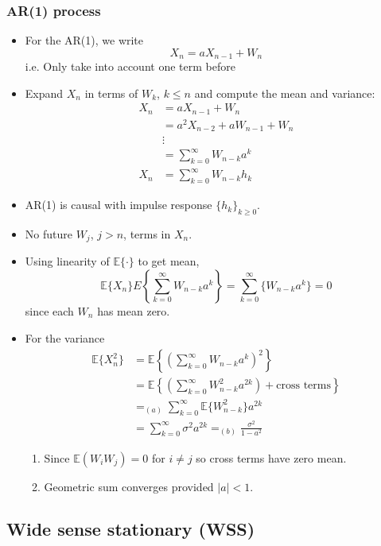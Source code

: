 \documentclass[12pt]{article}
\newcommand{\sigd}{\sigma^2}
\newcommand{\mexp}{\mathbb{E}}
\newcommand{\mexpval}[1]{\mathbb{E}(#1)}
\newcommand{\summ}[2]{\sum_{#1}^{#2}}
\newcommand{\sumkzeroinf}{\summ{k=0}{\infty}}
\begin{document}
\subsubsection{AR(1) process}
\begin{itemize}
    \item For the AR(1), we write
    \[
    X_n = a X_{n-1} + W_n
    \]
    i.e. Only take into account one term before
    \item Expand $X_n$ in terms of $W_k$, $k \le n$ and compute the mean and variance:
    \begin{align*}
        X_n & = a X_{n-1} + W_n\\
        & = a^2 X_{n-2} + a W_{n-1} + W_n\\
        & \vdots \\
        & = \summ{k=0}{\infty}W_{n-k}a^k \\
        X_n & = \summ{k=0}{\infty}W_{n-k}h_k
    \end{align*}
    \item AR(1) is causal with impulse response $\{h_k \}_{k\ge 0}$.
    \item No future $W_j$, $j > n$, terms in $X_n$.
    \item Using linearity of $\mexp\{\cdot\}$ to get mean,
    \[
    \mexp\{X_n\}E\left\{ \summ{k=0}{\infty}W_{n-k}a^k\right\}=\summ{k=0}{\infty}\{ W_{n-k}a^k\} = 0
    \]
    since each $W_n$ has mean zero.
    \item For the variance 
    \begin{align*}
        \mexp\{X_n^2\} &=\mexp \left\{\left(\sumkzeroinf W_{n-k}a^k  \right)^2 \right\} \\
         &=\mexp \left\{\left(\sumkzeroinf W_{n-k}^2a^{2k}  \right) + \textrm{cross terms}\right\} \\
        & =_{(a)} \sumkzeroinf \mexp\{W_{n-k}^2\} a^{2k} \\
        & = \sumkzeroinf \sigd a^{2k} =_{(b)} \frac{\sigd}{1-a^2}
    \end{align*}
    \begin{enumerate}[label=(\alph*)]
        \item Since $\mexpval{W_i W_j} = 0$ for $i\not = j$ so cross terms have zero mean.
        \item Geometric sum converges provided $|a|<1$.
    \end{enumerate}
\end{itemize}
\subsection{Wide sense stationary (WSS)}
\end{document}
